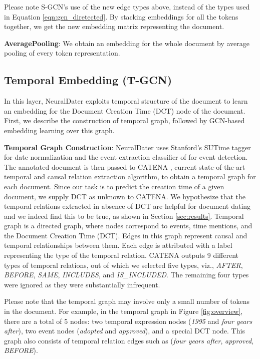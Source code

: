 \documentclass[11pt,a4paper]{article}
\newcommand{\refeqn}[1]{Equation \ref{#1}}
\newcommand{\reffig}[1]{Figure \ref{#1}}
\newcommand{\method}{NeuralDater}
\begin{document}
Please note S-GCN's use of the new edge types   above, instead of the  types used in \refeqn{eqn:gcn_diretected}. By stacking embeddings for all the tokens together, we get the new embedding matrix  representing the document.







\textbf{AveragePooling}: We obtain an embedding  for the whole document by average pooling of every token representation.




\subsection{Temporal Embedding (T-GCN)}
\label{sec:t-gcn}

In this layer, \method{} exploits temporal structure of the document to learn an embedding for the Document Creation Time (DCT) node of the document. First, we describe the construction of temporal graph, followed by GCN-based embedding learning over this graph.

\textbf{Temporal Graph Construction}: \method{} uses Stanford's SUTime tagger \cite{sutime_paper} for date normalization and the event extraction classifier of \cite{Chambers14} for event detection. The annotated document is then passed to CATENA \cite{catena_paper}, current state-of-the-art temporal and causal relation extraction algorithm, to obtain a temporal graph for each document. Since our task is to predict the creation time of a given document, we supply DCT as unknown to CATENA. We hypothesize that the temporal relations extracted in absence of DCT are helpful for document dating and we indeed find this to be true, as shown in Section \ref{sec:results}. Temporal graph is a directed graph, where nodes correspond to events, time mentions, and the Document Creation Time (DCT). Edges in this graph represent causal and temporal relationships between them. Each edge is attributed with a label representing the type of the temporal relation. CATENA outputs 9 different types of temporal relations, out of which we selected five types, viz.,  \textit{AFTER}, \textit{BEFORE}, \textit{SAME}, \textit{INCLUDES}, and  \textit{IS\_INCLUDED}. The remaining four types were ignored as they were substantially infrequent. 

Please note that the temporal graph may involve only a small number of tokens in the document. For example, in the temporal graph in \reffig{fig:overview}, there are a total of 5 nodes: two temporal expression nodes (\textit{1995} and \textit{four years after}), two event nodes (\textit{adopted} and \textit{approved}), and a special DCT node. This graph also consists of temporal relation edges such as (\textit{four years after}, \textit{approved}, \textit{BEFORE}). 
\end{document}
